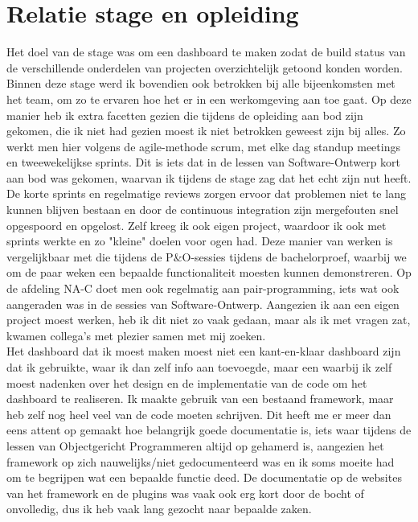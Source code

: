 \documentclass[10pt,a4paper]{article}
\begin{document}
\section{Relatie stage en opleiding}
Het doel van de stage was om een dashboard te maken zodat de build status van de verschillende onderdelen van projecten overzichtelijk getoond konden worden. Binnen deze stage werd ik bovendien ook betrokken bij alle bijeenkomsten met het team, om zo te ervaren hoe het er in een werkomgeving aan toe gaat. Op deze manier heb ik extra facetten gezien die tijdens de opleiding aan bod zijn gekomen, die ik niet had gezien moest ik niet betrokken geweest zijn bij alles. Zo werkt men hier volgens de agile-methode scrum, met elke dag standup meetings en tweewekelijkse sprints. Dit is iets dat in de lessen van Software-Ontwerp kort aan bod was gekomen, waarvan ik tijdens de stage zag dat het echt zijn nut heeft. De korte sprints en regelmatige reviews zorgen ervoor dat problemen niet te lang kunnen blijven bestaan en door de continuous integration zijn mergefouten snel opgespoord en opgelost. Zelf kreeg ik ook eigen project, waardoor ik ook met sprints werkte en zo "kleine" doelen voor ogen had. Deze manier van werken is vergelijkbaar met die tijdens de P\&O-sessies tijdens de bachelorproef, waarbij we om de paar weken een bepaalde functionaliteit moesten kunnen demonstreren. Op de afdeling NA-C doet men ook regelmatig aan pair-programming, iets wat ook aangeraden was in de sessies van Software-Ontwerp. Aangezien ik aan een eigen project moest werken, heb ik dit niet zo vaak gedaan, maar als ik met vragen zat, kwamen collega's met plezier samen met mij zoeken.\\
Het dashboard dat ik moest maken moest niet een kant-en-klaar dashboard zijn dat ik gebruikte, waar ik dan zelf info aan toevoegde, maar een waarbij ik zelf moest nadenken over het design en de implementatie van de code om het dashboard te realiseren. Ik maakte gebruik van een bestaand framework, maar heb zelf nog heel veel van de code moeten schrijven. Dit heeft me er meer dan eens attent op gemaakt hoe belangrijk goede documentatie is, iets waar tijdens de lessen van Objectgericht Programmeren altijd op gehamerd is, aangezien het framework op zich nauwelijks/niet gedocumenteerd was en ik soms moeite had om te begrijpen wat een bepaalde functie deed. De documentatie op de websites van het framework en de plugins  was vaak ook erg kort door de bocht of onvolledig, dus ik heb vaak lang gezocht naar bepaalde zaken.\\
\end{document}
